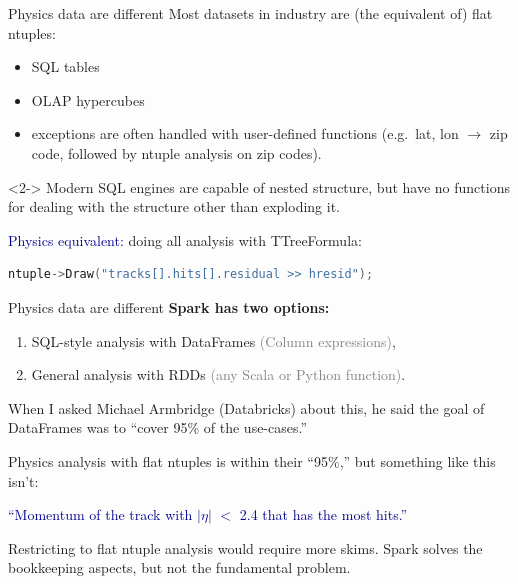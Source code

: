 \documentclass{beamer}
\begin{document}
\begin{frame}[fragile]{Physics data are different}
\vspace{0.5 cm}
Most datasets in industry are (the equivalent of) flat ntuples:
\begin{itemize}
\item SQL tables
\item OLAP hypercubes
\item exceptions are often handled with user-defined functions
(e.g.\ lat, lon $\to$ zip code, followed by ntuple analysis on zip codes).
\end{itemize}

\vfill
\begin{uncoverenv}<2->
Modern SQL engines are capable of nested structure, but have no functions for dealing with the structure other than exploding it.

\vspace{0.25 cm}
\textcolor{darkblue}{Physics equivalent:} doing all analysis with TTreeFormula:

\begin{lstlisting}[language=c]
ntuple->Draw("tracks[].hits[].residual >> hresid");
\end{lstlisting}
\end{uncoverenv}
\end{frame}

\begin{frame}{Physics data are different}
\vspace{0.25 cm}
{\bf Spark has two options:}
\begin{enumerate}
\item SQL-style analysis with DataFrames \textcolor{gray}{(Column expressions)},
\item General analysis with RDDs \textcolor{gray}{(any Scala or Python function)}.
\end{enumerate}
When I asked Michael Armbridge (Databricks) about this, he said the goal of DataFrames was to ``cover 95\% of the use-cases.''

\vfill
Physics analysis with flat ntuples is within their ``95\%,'' but something like this isn't:
\begin{center}
\begin{minipage}{0.95\linewidth}
\textcolor{darkblue}{``Momentum of the track with $|\eta|$ $<$ 2.4 that has the most hits.''}
\end{minipage}
\end{center}

\vfill
Restricting to flat ntuple analysis would require more skims. Spark solves the bookkeeping aspects, but not the fundamental problem.
\end{frame}
\end{document}
